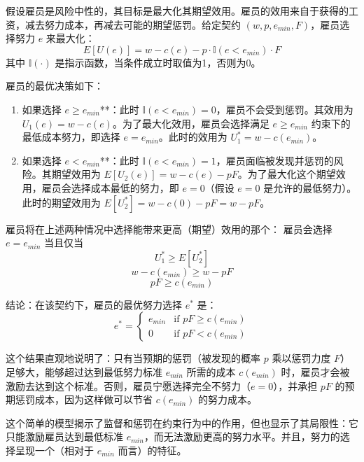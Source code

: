 假设雇员是风险中性的，其目标是最大化其期望效用。雇员的效用来自于获得的工资，减去努力成本，再减去可能的期望惩罚。给定契约 $(w, p, e_{min}, F)$，雇员选择努力 $e$ 来最大化：
\begin{equation}
E[U(e)] = w - c(e) - p \cdot \mathbb{I}(e < e_{min}) \cdot F
\end{equation}
其中 $\mathbb{I}(\cdot)$ 是指示函数，当条件成立时取值为1，否则为0。

雇员的最优决策如下：
\begin{enumerate}
    \item  如果选择 $e \ge e_{min}$**：此时 $\mathbb{I}(e < e_{min}) = 0$，雇员不会受到惩罚。其效用为 $U_1(e) = w - c(e)$。为了最大化效用，雇员会选择满足 $e \ge e_{min}$ 约束下的最低成本努力，即选择 $e = e_{min}$。此时的效用为 $U_1^* = w - c(e_{min})$。

    \item  如果选择 $e < e_{min}$**：此时 $\mathbb{I}(e < e_{min}) = 1$，雇员面临被发现并惩罚的风险。其期望效用为 $E[U_2(e)] = w - c(e) - pF$。为了最大化这个期望效用，雇员会选择成本最低的努力，即 $e=0$（假设 $e=0$ 是允许的最低努力）。此时的期望效用为 $E[U_2^*] = w - c(0) - pF = w - pF$。
\end{enumerate}

雇员将在上述两种情况中选择能带来更高（期望）效用的那个：
雇员会选择 $e = e_{min}$ 当且仅当
\begin{equation}
U_1^* \ge E[U_2^*]
\end{equation}
\begin{equation}
w - c(e_{min}) \ge w - pF
\end{equation}
\begin{equation}
pF \ge c(e_{min})
\end{equation}

{结论}：在该契约下，雇员的最优努力选择 $e^*$ 是：
\begin{equation}
e^* = \begin{cases} e_{min} & \text{if } pF \ge c(e_{min}) \\ 0 & \text{if } pF < c(e_{min}) \end{cases}
\end{equation}

这个结果直观地说明了：只有当预期的惩罚（被发现的概率 $p$ 乘以惩罚力度 $F$）足够大，能够超过达到最低努力标准 $e_{min}$ 所需的成本 $c(e_{min})$ 时，雇员才会被激励去达到这个标准。否则，雇员宁愿选择完全不努力（$e=0$），并承担 $pF$ 的预期惩罚成本，因为这样做可以节省 $c(e_{min})$ 的努力成本。

这个简单的模型揭示了监督和惩罚在约束行为中的作用，但也显示了其局限性：它只能激励雇员达到最低标准 $e_{min}$，而无法激励更高的努力水平。并且，努力的选择呈现一个（相对于 $e_{min}$ 而言）的特征。

